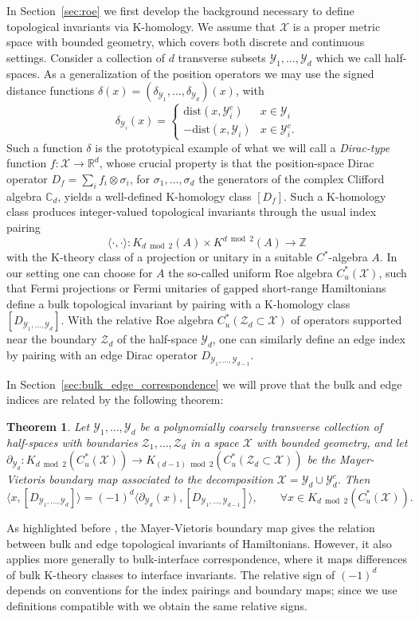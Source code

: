 \documentclass[12pt]{amsart}
\newtheorem{theorem}{Theorem}[section]
\newcommand{\CM}{{\mathbb C}}
\newcommand{\RM}{{\mathbb R}}
\newcommand{\ZM}{{\mathbb Z}}
\newcommand{\Xx}{{\mathcal X}}
\newcommand{\Yy}{{\mathcal Y}}
\newcommand{\Zz}{{\mathcal Z}}
\newcommand{\pdv}{\partial}
\begin{document}
In Section~\ref{sec:roe} we first develop the background necessary to define topological invariants via K-homology. 
We assume that $\Xx$ is a proper metric space with bounded geometry, which covers both discrete and continuous settings. Consider a collection of $d$ transverse subsets $\Yy_1,\dots, \Yy_d$ which we call half-spaces. As a generalization of the position operators we may use the signed distance functions $\delta(x) = (\delta_{\Yy_1},\dots, \delta_{\Yy_d})(x)$, with 
\[\delta_{\Yy_i}(x) = \begin{cases}
\mathrm{dist}(x,\Yy_i^c) & x\in \Yy_i\\
-\mathrm{dist}(x,\Yy_i) & x\in \Yy^c_i.
\end{cases}\]
Such a function $\delta$ is the prototypical example of what we will call a \emph{Dirac-type} function $f: \Xx \to \RM^d$, whose crucial property is that the position-space Dirac operator $D_f = \sum_i f_i \otimes \sigma_i$, for $\sigma_1,\ldots,\sigma_d$ the generators of the complex Clifford algebra $\CM_d$, yields a well-defined K-homology class $[D_f]$. 
Such a K-homology class produces integer-valued topological invariants through the usual index pairing 
$$\langle \cdot, \cdot \rangle: K_{d\bmod 2}(A) \times K^{d\bmod 2}(A)\to \ZM$$
with the K-theory class of a projection or unitary in a suitable $C^*$-algebra $A$. In our setting one can choose for $A$ the so-called uniform Roe algebra $C^*_u(\Xx)$, such that Fermi projections or Fermi unitaries of gapped short-range Hamiltonians define a bulk topological invariant by pairing with a K-homology class $[D_{\Yy_1,\ldots,\Yy_d}]$.
With the relative Roe algebra $C^*_u(\Zz_d\subset \Xx)$ of operators supported near the boundary $\Zz_d$ of the half-space $\Yy_d$, one can similarly define an edge index by pairing with an edge Dirac operator $D_{\Yy_1,\ldots,\Yy_{d-1}}$.

In Section~\ref{sec:bulk_edge_correspondence} we will prove that the bulk and edge indices are related by the following theorem:
\begin{theorem}
\label{th:bulk_edge_intro}
Let $\Yy_1,\ldots,\Yy_d$ be a polynomially coarsely transverse collection of half-spaces with boundaries $\Zz_1,\dots, \Zz_d$ in a space $\Xx$ with bounded geometry, and let $\pdv_{\Yy_d}: K_{d\bmod 2}(C^*_u(\Xx)) \to  K_{(d-1)\bmod 2}(C^*_u(\Zz_d\subset \Xx))$ be the Mayer-Vietoris boundary map associated to the decomposition $\Xx=\Yy_d\cup \Yy_d^c$. 
Then
$$\langle x, [D_{\Yy_{1},\ldots,\Yy_d}]\rangle = (-1)^{d} \langle \pdv_{\Yy_d}(x),  [D_{\Yy_{1},\ldots,\Yy_{d-1}}]\rangle, \qquad \forall x\in K_{d\bmod 2}(C^*_u(\Xx)).$$
\end{theorem}
As highlighted before \cite{EwertMeyer, Kubota17, LudewigThiang20, LudewigThiang25}, the Mayer-Vietoris boundary map gives the relation between bulk and edge topological invariants of Hamiltonians. However, it also applies more generally to bulk-interface correspondence, where it maps differences of bulk K-theory classes to interface invariants. The relative sign of $(-1)^{d}$ depends on conventions for the index pairings and boundary maps; since we use definitions compatible with \cite{ProdanSchulzBaldes2016} we obtain the same relative signs.
\end{document}
